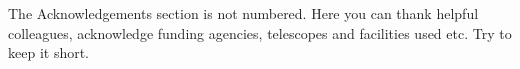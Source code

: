 \documentclass[a4paper,fleqn,usenatbib]{mnras}
\begin{document}
The Acknowledgements section is not numbered. Here you can thank helpful
colleagues, acknowledge funding agencies, telescopes and facilities used etc.
Try to keep it short.










\appendix




\bsp	%
\label{lastpage}
\end{document}
